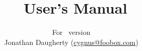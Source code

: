 \title{\mathblog\ User's Manual}
\author{
  For \mathblog\ version \mathblogversion\\
  Jonathan Daugherty (\href{mailto:cygnus@foobox.com}{cygnus@foobox.com})
}
\maketitle
